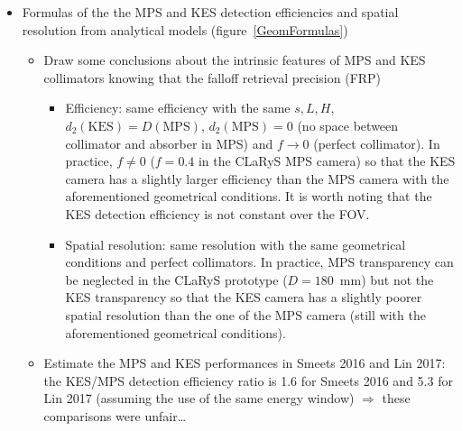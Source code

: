 \documentclass[a4paper,english]{article}
\begin{document}
\begin{itemize}
  \item Formulas of the the MPS and KES detection efficiencies and spatial resolution from analytical models (figure~\ref{GeomFormulas})

  \begin{itemize}
    \item Draw some conclusions about the intrinsic features of MPS and KES collimators knowing that the falloff retrieval precision (FRP)   
    \begin{itemize}
      \item Efficiency: same efficiency with the same $s, L, H$, $d_2(\text{KES}) = D(\text{MPS})$, $d_2(\text{MPS})=0$ (no space between collimator and absorber in MPS) and $f\longrightarrow0$ (perfect collimator). In practice, $f\ne 0$ ($f=0.4$ in the CLaRyS MPS camera) so that the KES camera has a slightly larger efficiency than the MPS camera with the aforementioned geometrical conditions. It is worth noting that the KES detection efficiency is not constant over the FOV.
      \item Spatial resolution: same resolution with the same geometrical conditions and perfect collimators. In practice, MPS transparency can be neglected in the CLaRyS prototype ($D = 180$~mm) but not the KES transparency so that the KES camera has a slightly poorer spatial resolution than the one of the MPS camera (still with the aforementioned geometrical conditions).
    \end{itemize}       
    \item Estimate the MPS and KES performances in Smeets 2016 and Lin 2017: the KES/MPS detection efficiency ratio is 1.6 for Smeets 2016 and 5.3 for Lin 2017 (assuming the use of the same energy window) $\Rightarrow$ these comparisons were unfair\dots   
  \end{itemize}
\end{itemize}
\end{document}

